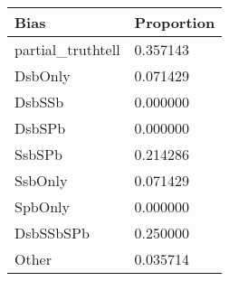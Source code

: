 \begin{tabular}{p{3cm}p{7cm}}
\toprule
Bias & Proportion \\
\midrule
partial_truthtell & 0.357143 \\
DsbOnly & 0.071429 \\
DsbSSb & 0.000000 \\
DsbSPb & 0.000000 \\
SsbSPb & 0.214286 \\
SsbOnly & 0.071429 \\
SpbOnly & 0.000000 \\
DsbSSbSPb & 0.250000 \\
Other & 0.035714 \\
\bottomrule
\end{tabular}
